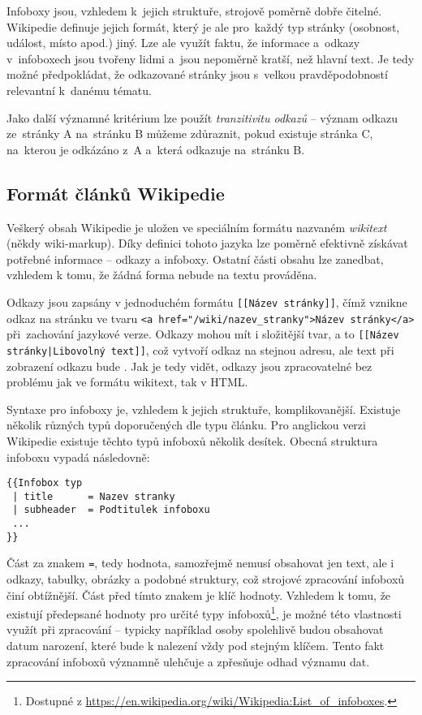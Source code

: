 Infoboxy jsou, vzhledem k~jejich struktuře, strojově poměrně dobře čitelné. Wikipedie definuje jejich formát, který je ale pro~každý typ stránky (osobnost, událost, místo apod.) jiný. Lze ale využít faktu, že informace a~odkazy v~infoboxech jsou tvořeny lidmi a~jsou nepoměrně kratší, než hlavní text. Je tedy možné předpokládat, že odkazované stránky jsou s~velkou pravděpodobností relevantní k~danému tématu.

Jako další významné kritérium lze použít \textit{tranzitivitu odkazů} -- význam odkazu ze~strán\-ky A na~stránku B můžeme zdůraznit, pokud existuje stránka C, na~kterou je odkázáno z~A a~která odkazuje na~stránku B.

\subsection{Formát článků Wikipedie} 
\label{label:wikiformat}
Veškerý obsah Wikipedie je uložen ve speciálním formátu nazvaném \textit{wikitext} (někdy wiki-markup). Díky definici tohoto jazyka lze poměrně efektivně získávat potřebné informace -- odkazy a infoboxy. Ostatní části obsahu lze zanedbat, vzhledem k tomu, že žádná forma  nebude na textu prováděna.

Odkazy jsou zapsány v jednoduchém formátu \texttt{[[Název stránky]]}, čímž vznikne odkaz na stránku ve tvaru \texttt{<a href="/wiki/nazev\_stranky\string"\string>Název stránky</a>} při~zachování jazykové verze. Odkazy mohou mít i složitější tvar, a to \texttt{[[Název stránky|Li\-bo\-vol\-ný text]]}, což vytvoří odkaz na stejnou adresu, ale text při zobrazení odkazu bude . Jak je tedy vidět, odkazy jsou zpracovatelné bez problému jak ve formátu wikitext, tak v HTML.

Syntaxe pro infoboxy je, vzhledem k jejich struktuře, komplikovanější. Existuje několik různých typů doporučených dle typu článku. Pro anglickou verzi Wikipedie e\-xis\-tu\-je těchto typů infoboxů několik desítek. Obecná struktura infoboxu vypadá následovně:

\begin{lstlisting}
{{Infobox typ
 | title      = Nazev stranky
 | subheader  = Podtitulek infoboxu
 ...
}}
\end{lstlisting} 

Část za znakem \texttt{=}, tedy hodnota, samozřejmě nemusí obsahovat jen text, ale i odkazy, tabulky, obrázky a podobné struktury, což strojové zpracování infoboxů činí obtížnější. Část před tímto znakem je klíč hodnoty. Vzhledem k tomu, že existují předepsané hodnoty pro určité typy infoboxů\footnote{Dostupné z \url{https://en.wikipedia.org/wiki/Wikipedia:List_of_infoboxes}.}, je možné této vlastnosti využít při zpracování -- typicky například osoby spolehlivě budou obsahovat datum narození, které bude k nalezení vždy pod stejným klíčem. Tento fakt zpracování infoboxů významně ulehčuje a zpřesňuje odhad významu dat.

